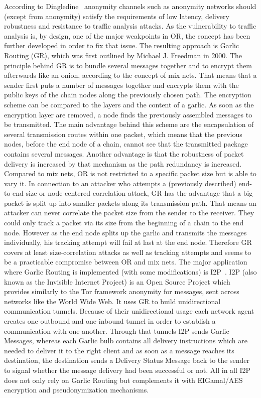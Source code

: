\documentclass{sig-alternate}
\begin{document}
According to Dingledine~\cite{dingledine2000free} anonymity channels such as anonymity networks should (except from anonymity) satisfy the requirements of low latency, delivery robustness and resistance to traffic analysis attacks. As the vulnerability to traffic analysis is, by design, one of the major weakpoints in OR, the concept has been further developed in order to fix that issue. The resulting approach is Garlic Routing (GR), which was first outlined by Michael J. Freedman in 2000. The principle behind GR is to bundle several messages together and to encrypt them afterwards like an onion, according to the concept of mix nets. That means that a sender first puts a number of messages together and encrypts them with the public keys of the chain nodes along the previously chosen path. The encryption scheme can be compared to the layers and the content of a garlic. As soon as the encryption layer are removed, a node finds the previously assembled messages to be transmitted. The main advantage behind this scheme are the encapsulation of several transmission routes within one packet, which means that the previous nodes, before the end node of a chain, cannot see that the transmitted package contains several messages. Another advantage is that the robustness of packet delivery is increased by that mechanism as the path redundancy is increased. Compared to mix nets, OR is not restricted to a specific packet size but is able to vary it. In connection to an attacker who attempts a (previously described) end-to-end size or node centered correlation attack, GR has the advantage that a big packet is split up into smaller packets along its transmission path. That means an attacker can never correlate the packet size from the sender to the receiver. They could only track a packet via its size from the beginning of a chain to the end node. However as the end node splits up the garlic and transmits the messages individually, his tracking attempt will fail at last at the end node. Therefore GR covers at least size-correlation attacks as well as tracking attempts and seems to be a practicable compromise between OR and mix nets. The major application where Garlic Routing is implemented (with some modifications) is I2P~\cite{i2p}. I2P (also known as the Invisible Internet Project) is an Open Source Project which provides similarly to the Tor framework anonymity for messages, sent across networks like the World Wide Web. It uses GR to build unidirectional communication tunnels. Because of their unidirectional usage each network agent creates one outbound and one inbound tunnel in order to establish a communication with one another. Through that tunnels I2P sends Garlic Messages, whereas each Garlic bulb contains all delivery instructions which are needed to deliver it to the right client and as soon as a message reaches its destination, the destination sends a Delivery Status Message back to the sender to signal whether the message delivery had been successful or not. All in all I2P does not only rely on Garlic Routing but complements it with EIGamal/AES encryption and pseudonymization mechanisms. 
\end{document}
